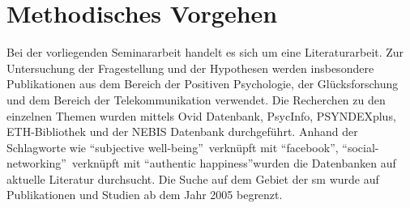 \section{Methodisches Vorgehen}\label{sec.vorgehen}
Bei der vorliegenden Seminararbeit handelt es sich um eine Literaturarbeit. Zur Untersuchung der Fragestellung und der Hypothesen werden insbesondere Publikationen aus dem Bereich der Positiven Psychologie, der Glücksforschung und dem Bereich der Telekommunikation verwendet. Die Recherchen zu den einzelnen Themen wurden mittels Ovid Datenbank, PsycInfo, PSYNDEXplus, ETH-Bibliothek und der NEBIS Datenbank durchgeführt. Anhand der Schlagworte wie \textquotedblleft subjective well-being\textquotedblright \ verknüpft mit \textquotedblleft facebook\textquotedblright, \textquotedblleft social-networking\textquotedblright \ verknüpft mit \textquotedblleft authentic happiness\textquotedblright wurden die Datenbanken auf aktuelle Literatur durchsucht. Die Suche auf dem Gebiet der \gls{sm} wurde auf Publikationen und Studien ab dem Jahr 2005 begrenzt. 


